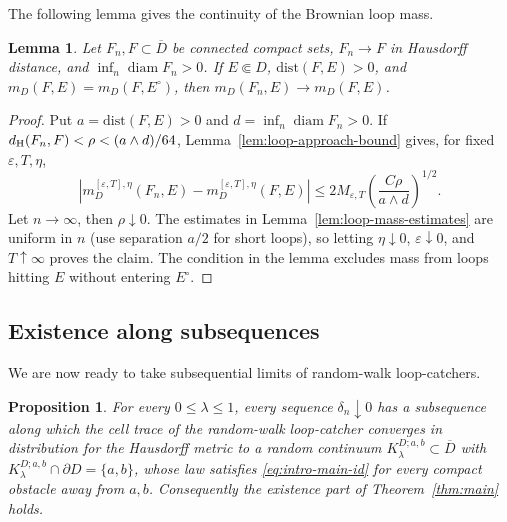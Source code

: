\documentclass[11pt]{article}
\numberwithin{equation}{section}
\newcommand{\1}{\mathbf{1}}
\newcommand{\dist}{\mathrm{dist}}
\newtheorem{lemma}[theorem]{Lemma}
\newtheorem{proposition}[theorem]{Proposition}
\newcommand\ol[1]{\overline{#1}}
\newcommand{\diam}{\operatorname{diam}}
\begin{document}
The following lemma gives the continuity of the Brownian loop mass.
\begin{lemma}\label{lem:moving-continuum}
Let \(F_n,F\subset\ol D\) be connected compact sets,
\(F_n\to F\) in Hausdorff distance, and \(\inf_n\diam F_n>0\).  If
\(E\Subset D\), \(\dist(F,E)>0\), and $m_D(F,E)=m_D(F,E^\circ)$,
then \(m_D(F_n,E)\to m_D(F,E)\).
\end{lemma}
\begin{proof}
Put \(a=\dist(F,E)>0\) and \(d=\inf_n\diam F_n>0\).  If
\(d_{\rm H}(F_n,F)<\rho<(a\wedge d)/64\), Lemma~\ref{lem:loop-approach-bound} gives, for fixed
\(\varepsilon,T,\eta\),
\[
 \left|m_D^{[\varepsilon,T],\eta}(F_n,E)
             -m_D^{[\varepsilon,T],\eta}(F,E)\right|
 \leq 2M_{\varepsilon,T}
       \left(\frac{C\rho}{a\wedge d}\right)^{1/2}.
\]
Let \(n\to\infty\), then \(\rho\downarrow0\).  The estimates in
Lemma~\ref{lem:loop-mass-estimates} are uniform in \(n\) (use separation
\(a/2\) for short loops), so letting \(\eta\downarrow0\),
\(\varepsilon\downarrow0\), and \(T\uparrow\infty\) proves the claim.  The condition in the lemma excludes mass from loops hitting \(E\) without entering
\(E^\circ\).
\end{proof}
\subsection{Existence along subsequences}

We are now ready to take subsequential limits of random-walk loop-catchers.
\label{subsec:continuum-catcher}
\begin{proposition}\label{prop:catcher-cluster}
For every \(0\leq\lambda\leq1\), every sequence \(\delta_n\downarrow0\)
has a subsequence along which the cell trace of the random-walk loop-catcher
converges in distribution for the Hausdorff metric to a random continuum
\(K_\lambda^{D;a,b}\subset\ol D\) with
\(K_\lambda^{D;a,b}\cap\partial D=\{a,b\}\), whose law satisfies \eqref{eq:intro-main-id} for every compact obstacle away
from \(a,b\).  Consequently the existence part of
Theorem~\ref{thm:main} holds.
\end{proposition}
\end{document}
